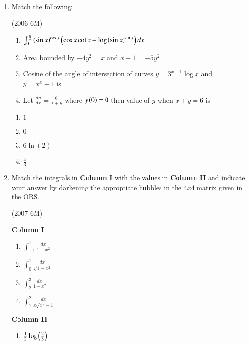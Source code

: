 \documentclass[journal,12pt,onecolumn]{IEEEtran}
\theoremstyle{remark}
\begin{document}
	\begin{enumerate}
		\item Match the following:

			\hfill{(2006-6M)}
			\begin{multicols}{2}
				\begin{enumerate}
				\item	$\int_{0}^{\frac{\pi}{2}} \left({\sin x}\right)^{\cos x} \left(\cos x\cot x-\log\left(\sin x\right)^{\sin x}\right) dx $
				\item Area bounded by $-4y^{2}=x$ and $x-1=-5y^{2}$
				\item Cosine of the angle of intersection of curves $y=3^{x-1}\log x$ and $y=x^{x}-1$ is
				\item Let $\frac{dy}{dx}=\frac{6}{x+y}$ where $y\left(0\right)=0$ then value of $y$ when $x+y=6$ is
				\end{enumerate}
			\columnbreak
				\begin{enumerate}
					\item $1$
						
					\item $0$

					\item $6\ln(2)$

					\item $\frac{4}{3}$
						
				\end{enumerate}
				\end{multicols}
			\item Match the integrals in \textbf{Column I} with the values in \textbf{Column II} and indicate your answer by darkening the appropriate bubbles in the $4x4$ matrix given in the ORS. 

			\hfill{(2007-6M)}
			\begin{multicols}{2}
				\textbf{Column I}

				\begin{enumerate}
					\item $\int_{-1}^{1}\frac{dx}{1+x^{2}}$
					\item $\int_{0}^{1}\frac{dx}{\sqrt{1-x^{2}}}$
					\item $\int_{2}^{3}\frac{dx}{1-x^{2}}$
					\item $\int_{1}^{2}\frac{dx}{x\sqrt{x^{2}-1}}$
				\end{enumerate}
			\columnbreak
				\textbf{Column II}
				\begin{enumerate}
					\item $\frac{1}{2}\log\left(\frac{2}{3}\right)$


\end{enumerate}
\end{multicols}
\end{enumerate}
\end{document}
